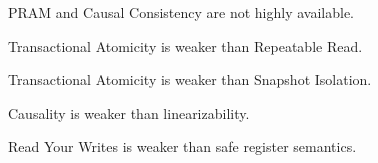 \begin{corollary}
PRAM and Causal Consistency are not highly available.
\end{corollary}


\begin{definition}
\end{definition}

\begin{definition}
\end{definition}

\begin{definition}
\end{definition}

\begin{definition}
\end{definition}

\begin{definition}
\end{definition}

\begin{definition}
\end{definition}

\begin{definition}
\end{definition}

\begin{definition}
\end{definition}

\begin{observation}
Transactional Atomicity is weaker than Repeatable Read.
\end{observation}

\begin{observation}
Transactional Atomicity is weaker than Snapshot Isolation.
\end{observation}

\begin{observation}
Causality is weaker than linearizability.
\end{observation}

\begin{observation}
Read Your Writes is weaker than safe register semantics.
\end{observation}

